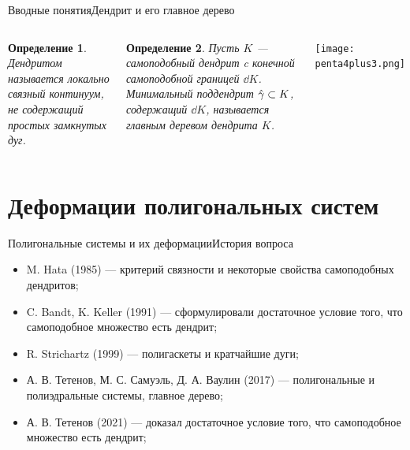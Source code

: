 \documentclass[aspectratio=1610, 10pt, notheorems]{beamer}
\newtheorem{definition}  {Определение}
\begin{document}
\begin{frame}{Вводные понятия}{Дендрит и его главное дерево}
\begin{columns}
\begin{definition} 
Дендритом называется локально связный континуум, не содержащий простых замкнутых дуг.
\end{definition}
\;\par\;\par
\begin{definition}
Пусть $K$ --- самоподобный дендрит c конечной самоподобной границей $\dd K$. 
Минимальный поддендрит $\hat\gamma\subset K$, содержащий $\dd K$, называется {\em главным деревом} дендрита $K$.
\end{definition}
\texttt{[image: penta4plus3.png]}
\end{columns}

\end{frame}

\section{Деформации полигональных систем} %


\begin{frame}{Полигональные системы и их деформации}{История вопроса}
\begin{itemize}
    \item M. Hata (1985) --- критерий связности и некоторые свойства самоподобных дендритов;
    \item C. Bandt, K. Keller (1991) --- сформулировали достаточное условие того, что самоподобное множество есть дендрит;
    \item R. Strichartz (1999) --- полигаскеты и кратчайшие дуги;
    \item А. В. Тетенов, М. С. Самуэль, Д. А. Ваулин (2017) --- полигональные и полиэдральные системы, главное дерево;
    \item А. В. Тетенов (2021) --- доказал достаточное условие того, что самоподобное множество есть дендрит;
\end{itemize}
\end{frame}
\end{document}
